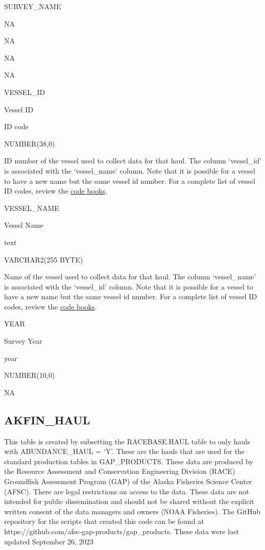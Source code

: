\documentclass[
  letterpaper,
  oneside,
  open=any]{scrbook}
\begin{document}
SURVEY\_NAME

NA

NA

NA

NA

VESSEL\_ID

Vessel ID

ID code

NUMBER(38,0)

ID number of the vessel used to collect data for that haul. The column
`vessel\_id' is associated with the `vessel\_name' column. Note that it
is possible for a vessel to have a new name but the same vessel id
number. For a complete list of vessel ID codes, review the
\href{https://www.fisheries.noaa.gov/resource/document/groundfish-survey-species-code-manual-and-data-codes-manual}{code
books}.

VESSEL\_NAME

Vessel Name

text

VARCHAR2(255 BYTE)

Name of the vessel used to collect data for that haul. The column
`vessel\_name' is associated with the `vessel\_id' column. Note that it
is possible for a vessel to have a new name but the same vessel id
number. For a complete list of vessel ID codes, review the
\href{https://www.fisheries.noaa.gov/resource/document/groundfish-survey-species-code-manual-and-data-codes-manual}{code
books}.

YEAR

Survey Year

year

NUMBER(10,0)

NA

\hypertarget{akfin_haul}{%
\subsection{AKFIN\_HAUL}\label{akfin_haul}}

This table is created by subsetting the RACEBASE.HAUL table to only
hauls with ABUNDANCE\_HAUL = `Y'. These are the hauls that are used for
the standard production tables in GAP\_PRODUCTS. These data are produced
by the Resource Assessment and Conservation Engineering Division (RACE)
Groundfish Assessment Program (GAP) of the Alaska Fisheries Science
Center (AFSC). There are legal restrictions on access to the data. These
data are not intended for public dissemination and should not be shared
without the explicit written consent of the data managers and owners
(NOAA Fisheries). The GitHub repository for the scripts that created
this code can be found at
https://github.com/afsc-gap-products/gap\_products. These data were last
updated September 26, 2023
\end{document}
